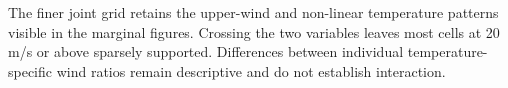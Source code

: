 The finer joint grid retains the upper-wind and non-linear temperature patterns visible in the marginal figures. Crossing the two variables leaves most cells at 20 m/s or above sparsely supported. Differences between individual temperature-specific wind ratios remain descriptive and do not establish interaction.

